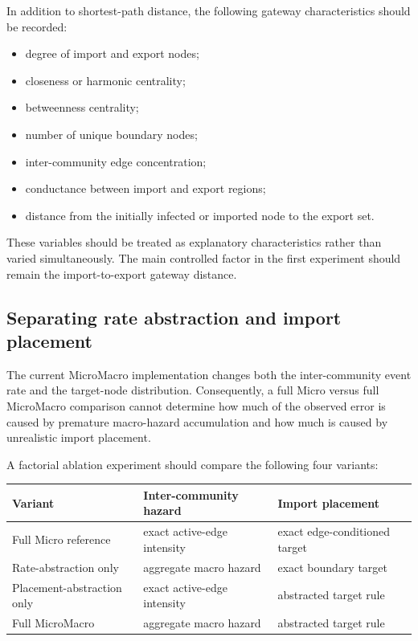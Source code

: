 \documentclass[12pt,a4paper]{article}
\begin{document}
In addition to shortest-path distance, the following gateway characteristics should be recorded:
\begin{itemize}
    \item degree of import and export nodes;
    \item closeness or harmonic centrality;
    \item betweenness centrality;
    \item number of unique boundary nodes;
    \item inter-community edge concentration;
    \item conductance between import and export regions;
    \item distance from the initially infected or imported node to the export set.
\end{itemize}

These variables should be treated as explanatory characteristics rather than varied simultaneously. The main controlled factor in the first experiment should remain the import-to-export gateway distance.

\subsection{Separating rate abstraction and import placement}

The current MicroMacro implementation changes both the inter-community event rate and the target-node distribution. Consequently, a full Micro versus full MicroMacro comparison cannot determine how much of the observed error is caused by premature macro-hazard accumulation and how much is caused by unrealistic import placement.

A factorial ablation experiment should compare the following four variants:
\begin{center}
\begin{tabular}{lll}
\hline
Variant & Inter-community hazard & Import placement \\
\hline
Full Micro reference
& exact active-edge intensity
& exact edge-conditioned target
\\
Rate-abstraction only
& aggregate macro hazard
& exact boundary target
\\
Placement-abstraction only
& exact active-edge intensity
& abstracted target rule
\\
Full MicroMacro
& aggregate macro hazard
& abstracted target rule
\\
\hline
\end{tabular}
\end{center}
\end{document}

